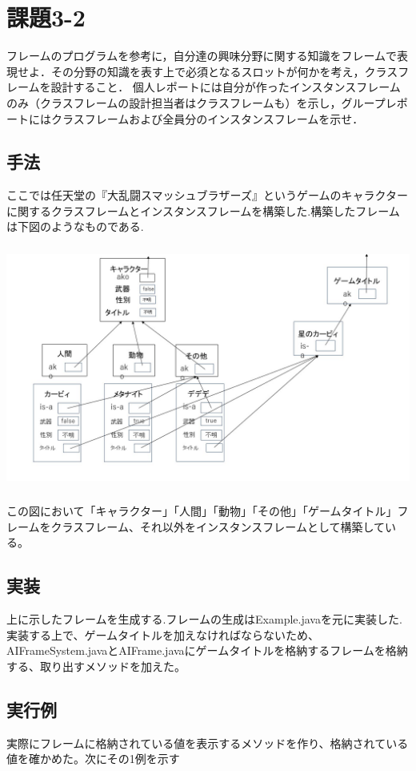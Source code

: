 \documentclass[a4j]{jarticle}
\begin{document}
\section{課題3-2}
\begin{screen}
フレームのプログラムを参考に，自分達の興味分野に関する知識をフレームで表現せよ．その分野の知識を表す上で必須となるスロットが何かを考え，クラスフレームを設計すること．
個人レポートには自分が作ったインスタンスフレームのみ（クラスフレームの設計担当者はクラスフレームも）を示し，グループレポートにはクラスフレームおよび全員分のインスタンスフレームを示せ．
\end{screen}

\subsection{手法}
ここでは任天堂の『大乱闘スマッシュブラザーズ』というゲームのキャラクターに関するクラスフレームとインスタンスフレームを構築した.構築したフレームは下図のようなものである.


\includegraphics[width=150mm,height=80mm]
{Frame-Kirby.jpg}

この図において「キャラクター」「人間」「動物」「その他」「ゲームタイトル」フレームをクラスフレーム、それ以外をインスタンスフレームとして構築している。


\subsection{実装}
上に示したフレームを生成する.フレームの生成はExample.javaを元に実装した.\\
実装する上で、ゲームタイトルを加えなければならないため、AIFrameSystem.javaとAIFrame.javaにゲームタイトルを格納するフレームを格納する、取り出すメソッドを加えた。
\subsection{実行例}
実際にフレームに格納されている値を表示するメソッドを作り、格納されている値を確かめた。次にその1例を示す
\\
\end{document}
